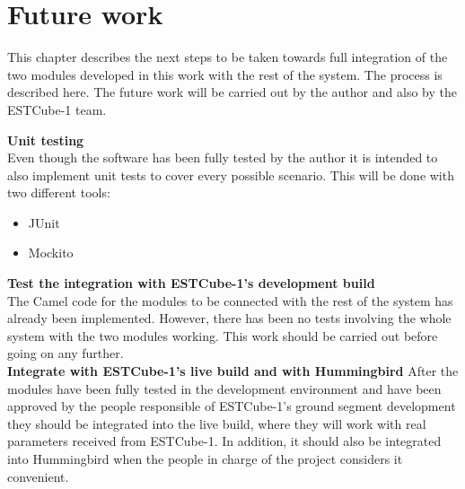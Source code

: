 \chapter{Future work}

This chapter describes the next steps to be taken towards full integration of the two modules developed in this work with the rest of the system. The process is described here. The future work will be carried out by the author and also by the ESTCube-1 team.


\textbf{Unit testing}\\
Even though the software has been fully tested by the author it is intended to also implement unit tests to cover every possible scenario. This will be done with two different tools:
\begin{itemize}
\item JUnit\cite{JUnit}
\item Mockito\cite{Mockito}
\end{itemize}



\textbf{Test the integration with ESTCube-1's development build}\\
The Camel code for the modules to be connected with the rest of the system has already been implemented. However, there has been no tests involving the whole system with the two modules working. This work should be carried out before going on any further.\\

\textbf{Integrate with ESTCube-1's live build and with Hummingbird}
After the modules have been fully tested in the development environment and have been approved by the people responsible of ESTCube-1's ground segment development they should be integrated into the live build, where they will work with real parameters received from ESTCube-1. In addition, it should also be integrated into Hummingbird when the people in charge of the project considers it convenient.\\




\newpage

